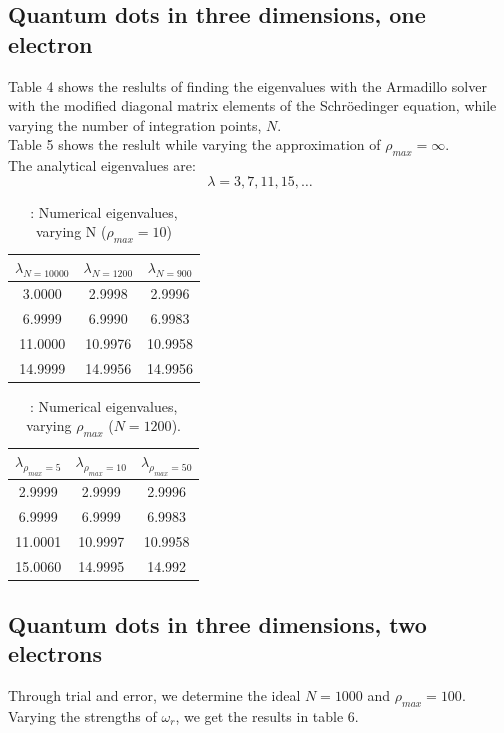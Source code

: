 \documentclass{article}
\begin{document}
	\subsection{Quantum dots in three dimensions, one electron}
		Table 4 shows the reslults of finding the eigenvalues with the Armadillo solver with the modified diagonal matrix elements
		of the Schröedinger equation, while varying the number of integration points, $N$. \\
		Table 5 shows the reslult while varying the approximation of $\rho_{max} = \infty$. \\
		The analytical eigenvalues are:
		\begin{equation*}
			\lambda = 3,7,11,15,\hdots
		\end{equation*}


		\begin{table}[h!]
			\caption{: Numerical eigenvalues, varying N ($\rho_{max} = 10$)}
			\begin{tabular}{c c c}
				$\lambda_{N=10000}$ & $\lambda_{N=1200}$ & $\lambda_{N=900}$ \\
				\hline
				3.0000 & 2.9998 & 2.9996  \\
				6.9999 & 6.9990 & 6.9983  \\
				11.0000 & 10.9976 & 10.9958  \\
				14.9999 & 14.9956 & 14.9956  \\
			\end{tabular}
		\end{table}
		\begin{table}[h!]
			\caption{: Numerical eigenvalues, varying $\rho_{max}$ ($N = 1200$).}
			\begin{tabular}{c c c}
				$\lambda_{\rho_{max} = 5}$ & $\lambda_{\rho_{max} = 10}$ & $\lambda_{\rho_{max} = 50}$\\
				\hline
				2.9999 & 2.9999 & 2.9996 \\
				6.9999 & 6.9999 & 6.9983 \\
				11.0001 & 10.9997 & 10.9958 \\
				15.0060 & 14.9995 & 14.992 \\
			\end{tabular}
		\end{table}


	\subsection{Quantum dots in three dimensions, two electrons}
		Through trial and error, we determine the ideal $N = 1000$ and $\rho_{max} = 100$.
		Varying the strengths of $\omega_r$, we get the results in table 6.
\end{document}
